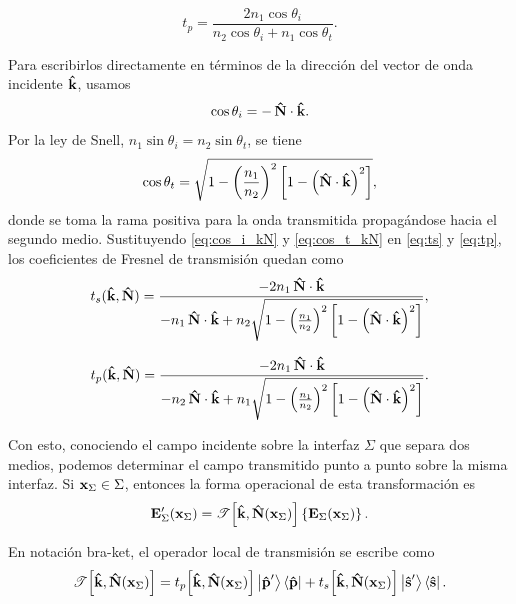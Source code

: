 \begin{equation}
  t_p =
  \frac{2 n_1 \cos\theta_i}
  {n_2\cos\theta_i+n_1\cos\theta_t}.
  \label{eq:tp}
\end{equation}

Para escribirlos directamente en términos de la dirección del vector de onda incidente $\bm{\hat{\mathbf{k}}}$, usamos
\begin{equation}
  \cos\theta_i = -\,\bm{\hat{\mathbf{N}}}\cdot\bm{\hat{\mathbf{k}}}.
  \label{eq:cos_i_kN}
\end{equation}
Por la ley de Snell, $n_1\sin\theta_i=n_2\sin\theta_t$, se tiene
\begin{equation}
  \cos\theta_t
  = \sqrt{1-\left(\frac{n_1}{n_2}\right)^2
  \left[1-\left(\bm{\hat{\mathbf{N}}}\cdot\bm{\hat{\mathbf{k}}}\right)^2\right]},
  \label{eq:cos_t_kN}
\end{equation}
donde se toma la rama positiva para la onda transmitida propagándose hacia el segundo medio. Sustituyendo \eqref{eq:cos_i_kN} y \eqref{eq:cos_t_kN} en \eqref{eq:ts} y \eqref{eq:tp}, los coeficientes de Fresnel de transmisión quedan como
\begin{equation}
t_s(\bm{\hat{\mathbf{k}}},\bm{\hat{\mathbf{N}}}) =
\frac{-2 n_1\,\bm{\hat{\mathbf{N}}}\cdot\bm{\hat{\mathbf{k}}}}
{-n_1\,\bm{\hat{\mathbf{N}}}\cdot\bm{\hat{\mathbf{k}}}
+ n_2\sqrt{1-\left(\frac{n_1}{n_2}\right)^2
\left[1-\left(\bm{\hat{\mathbf{N}}}\cdot\bm{\hat{\mathbf{k}}}\right)^2\right]}},
\label{eq:ts_kN}
\end{equation}

\begin{equation}
t_p(\bm{\hat{\mathbf{k}}},\bm{\hat{\mathbf{N}}}) =
\frac{-2 n_1\,\bm{\hat{\mathbf{N}}}\cdot\bm{\hat{\mathbf{k}}}}
{-n_2\,\bm{\hat{\mathbf{N}}}\cdot\bm{\hat{\mathbf{k}}}
+ n_1\sqrt{1-\left(\frac{n_1}{n_2}\right)^2
\left[1-\left(\bm{\hat{\mathbf{N}}}\cdot\bm{\hat{\mathbf{k}}}\right)^2\right]}}.
\label{eq:tp_kN}
\end{equation}

Con esto, conociendo el campo incidente sobre la interfaz $\Sigma$ que separa dos medios, podemos determinar el campo transmitido punto a punto sobre la misma interfaz. Si $\vb x_\Sigma\in\Sigma$, entonces la forma operacional de esta transformación es
\begin{equation}
  \vb{E}'_{\Sigma}(\vb x_\Sigma)
  =
  \mathscr{T}\!\left[
  \bm{\hat{\mathbf{k}}},\bm{\hat{\mathbf{N}}}(\vb x_\Sigma)
  \right]
  \left\{\vb{E}_{\Sigma}(\vb x_\Sigma)\right\}.
\end{equation}

En notación bra-ket, el operador local de transmisión se escribe como
\begin{equation}
  \mathscr{T}\!\left[
  \bm{\hat{\mathbf{k}}},\bm{\hat{\mathbf{N}}}(\vb x_\Sigma)
  \right]
  =
  t_p\!\left[
  \bm{\hat{\mathbf{k}}},\bm{\hat{\mathbf{N}}}(\vb x_\Sigma)
  \right]
  \ket{\bm{\hat{\mathbf{p}}}'}
  \bra{\bm{\hat{\mathbf{p}}}}
  +
  t_s\!\left[
  \bm{\hat{\mathbf{k}}},\bm{\hat{\mathbf{N}}}(\vb x_\Sigma)
  \right]
  \ket{\bm{\hat{\mathbf{s}}}'}
  \bra{\bm{\hat{\mathbf{s}}}}.
\end{equation}

